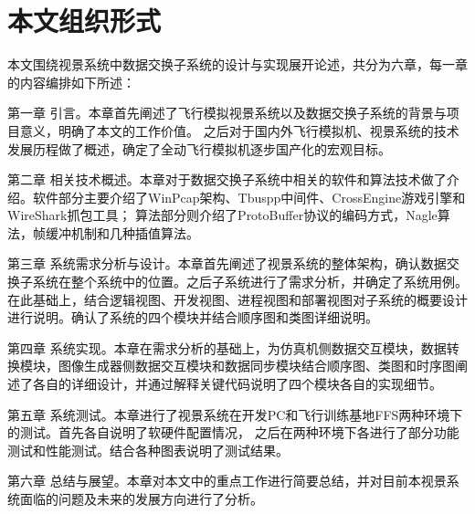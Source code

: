 \section{本文组织形式}
本文围绕视景系统中数据交换子系统的设计与实现展开论述，共分为六章，每一章的内容编排如下所述：\par
第一章 引言。本章首先阐述了飞行模拟视景系统以及数据交换子系统的背景与项目意义，明确了本文的工作价值。
       之后对于国内外飞行模拟机、视景系统的技术发展历程做了概述，确定了全动飞行模拟机逐步国产化的宏观目标。\par
第二章 相关技术概述。本章对于数据交换子系统中相关的软件和算法技术做了介绍。软件部分主要介绍了WinPcap架构、Tbuspp中间件、CrossEngine游戏引擎和WireShark抓包工具；
       算法部分则介绍了ProtoBuffer协议的编码方式，Nagle算法，帧缓冲机制和几种插值算法。\par
第三章 系统需求分析与设计。本章首先阐述了视景系统的整体架构，确认数据交换子系统在整个系统中的位置。之后子系统进行了需求分析，并确定了系统用例。
       在此基础上，结合逻辑视图、开发视图、进程视图和部署视图对子系统的概要设计进行说明。确认了系统的四个模块并结合顺序图和类图详细说明。\par
第四章 系统实现。本章在需求分析的基础上，为仿真机侧数据交互模块，数据转换模块，图像生成器侧数据交互模块和数据同步模块结合顺序图、类图和时序图阐述了各自的详细设计，并通过解释关键代码说明了四个模块各自的实现细节。\par
第五章 系统测试。本章进行了视景系统在开发PC和飞行训练基地FFS两种环境下的测试。首先各自说明了软硬件配置情况，
       之后在两种环境下各进行了部分功能测试和性能测试。结合各种图表说明了测试结果。\par
第六章 总结与展望。本章对本文中的重点工作进行简要总结，并对目前本视景系统面临的问题及未来的发展方向进行了分析。